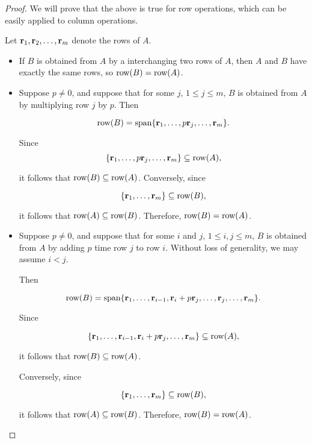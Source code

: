 \begin{proof}
We will prove that the above is true for row operations, which can be easily applied to column operations. 

Let ${\bf r}_1, {\bf r}_2, \ldots, {\bf r}_m$ denote the rows of $A$.

\begin{itemize}
\item If $B$ is obtained from $A$ by a interchanging two rows of $A$, then
$A$ and $B$ have exactly the same rows, so $\mbox{row}(B)=\mbox{row}(A)$.

\item
Suppose $p\neq 0$, and suppose that for some $j$, $1\leq j\leq m$,
$B$ is obtained from $A$ by multiplying row $j$ by $p$.
Then 

\[ \mbox{row}(B)=\mbox{span}\{ {\bf r}_1, \ldots, 
p{\bf r}_{j}, \ldots, {\bf r}_m\}.  \]

Since
\[ \{ {\bf r}_1, \ldots, 
p{\bf r}_{j}, \ldots, {\bf r}_m\} \subseteq\mbox{row}(A),\]

it follows that $\mbox{row}(B)\subseteq\mbox{row}(A)$.
Conversely, since

\[ \{ {\bf r}_1, \ldots, {\bf r}_m\}\subseteq\mbox{row}(B),\]

it follows that $\mbox{row}(A)\subseteq\mbox{row}(B)$.
Therefore, $\mbox{row}(B)=\mbox{row}(A)$.

\item
Suppose $p\neq 0$, and suppose that for some $i$ and $j$,
$1\leq i,j\leq m$,
$B$ is obtained from $A$ by adding $p$ time row $j$ to row $i$.
Without loss of generality, we may assume $i<j$.

Then 

\[ \mbox{row}(B)=\mbox{span}\{ {\bf r}_1, \ldots, {\bf r}_{i-1},
{\bf r}_i+p{\bf r}_j, \ldots,{\bf r}_j,\ldots, {\bf r}_m\}.  \]

Since

\[ \{ {\bf r}_1, \ldots, {\bf r}_{i-1}, 
{\bf r}_i+p{\bf r}_{j}, \ldots, {\bf r}_m\} \subseteq\mbox{row}(A),\]

it follows that $\mbox{row}(B)\subseteq\mbox{row}(A)$.

Conversely, since

\[ \{ {\bf r}_1, \ldots, {\bf r}_m\}\subseteq\mbox{row}(B),\]

it follows that $\mbox{row}(A)\subseteq\mbox{row}(B)$.
Therefore, $\mbox{row}(B)=\mbox{row}(A)$.
\end{itemize}
\end{proof}

